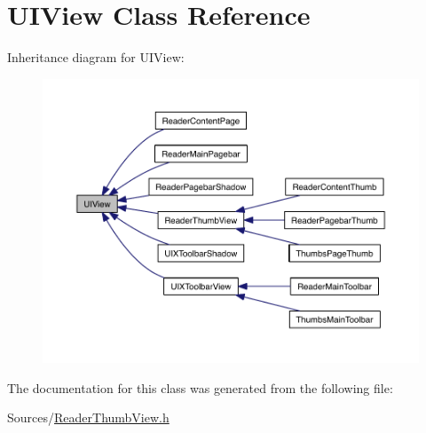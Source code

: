 \hypertarget{class_u_i_view}{\section{U\-I\-View Class Reference}
\label{db/d6b/class_u_i_view}
}


Inheritance diagram for U\-I\-View\-:
\nopagebreak
\begin{figure}[H]
\begin{center}
\leavevmode
\includegraphics[width=350pt]{d9/da1/class_u_i_view__inherit__graph}
\end{center}
\end{figure}


The documentation for this class was generated from the following file\-:\begin{DoxyCompactItemize}
\item 
Sources/\hyperlink{_reader_thumb_view_8h}{Reader\-Thumb\-View.\-h}\end{DoxyCompactItemize}

